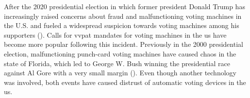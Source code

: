 After the 2020 presidential election in which former president Donald Trump has increasingly raised concerns about fraud and malfunctioning voting machines in the U.S. and fueled a widespread suspicion towards voting machines among his supporters (\cite{Giles.2020}). Calls for \acrshort{vvpat} mandates for voting machines in the \acrshort{us} have become more popular following this incident. Previously in the 2000 presidential election, malfunctioning punch-card voting machines have caused chaos in the state of Florida, which led to George W. Bush winning the presidential race against Al Gore with a very small margin (\cite{Kettle.2001}). Even though another technology was involved, both events have caused distrust of automatic voting devices in the \acrshort{us}.